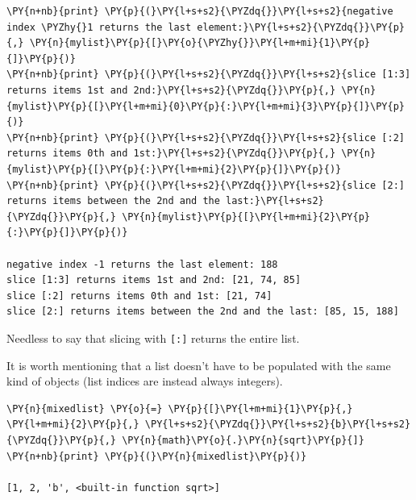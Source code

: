 \begin{codebox}[breakable, size=fbox, boxrule=1pt, pad at break*=1mm, colback=cellbackground, colframe=cellborder]
\begin{Verbatim}[commandchars=\\\{\}]
\PY{n+nb}{print} \PY{p}{(}\PY{l+s+s2}{\PYZdq{}}\PY{l+s+s2}{negative index \PYZhy{}1 returns the last element:}\PY{l+s+s2}{\PYZdq{}}\PY{p}{,} \PY{n}{mylist}\PY{p}{[}\PY{o}{\PYZhy{}}\PY{l+m+mi}{1}\PY{p}{]}\PY{p}{)}
\PY{n+nb}{print} \PY{p}{(}\PY{l+s+s2}{\PYZdq{}}\PY{l+s+s2}{slice [1:3] returns items 1st and 2nd:}\PY{l+s+s2}{\PYZdq{}}\PY{p}{,} \PY{n}{mylist}\PY{p}{[}\PY{l+m+mi}{0}\PY{p}{:}\PY{l+m+mi}{3}\PY{p}{]}\PY{p}{)}
\PY{n+nb}{print} \PY{p}{(}\PY{l+s+s2}{\PYZdq{}}\PY{l+s+s2}{slice [:2] returns items 0th and 1st:}\PY{l+s+s2}{\PYZdq{}}\PY{p}{,} \PY{n}{mylist}\PY{p}{[}\PY{p}{:}\PY{l+m+mi}{2}\PY{p}{]}\PY{p}{)}
\PY{n+nb}{print} \PY{p}{(}\PY{l+s+s2}{\PYZdq{}}\PY{l+s+s2}{slice [2:] returns items between the 2nd and the last:}\PY{l+s+s2}{\PYZdq{}}\PY{p}{,} \PY{n}{mylist}\PY{p}{[}\PY{l+m+mi}{2}\PY{p}{:}\PY{p}{]}\PY{p}{)}

negative index -1 returns the last element: 188
slice [1:3] returns items 1st and 2nd: [21, 74, 85]
slice [:2] returns items 0th and 1st: [21, 74]
slice [2:] returns items between the 2nd and the last: [85, 15, 188]
\end{Verbatim}
\end{codebox}
\noindent
Needless to say that slicing with \texttt{[:]} returns the entire list.

It is worth mentioning that a list doesn't have to be populated
with the same kind of objects (list indices are instead always
integers).

\begin{codebox}[breakable, size=fbox, boxrule=1pt, pad at break*=1mm, colback=cellbackground, colframe=cellborder]
\begin{Verbatim}[commandchars=\\\{\}]
\PY{n}{mixedlist} \PY{o}{=} \PY{p}{[}\PY{l+m+mi}{1}\PY{p}{,} \PY{l+m+mi}{2}\PY{p}{,} \PY{l+s+s2}{\PYZdq{}}\PY{l+s+s2}{b}\PY{l+s+s2}{\PYZdq{}}\PY{p}{,} \PY{n}{math}\PY{o}{.}\PY{n}{sqrt}\PY{p}{]}
\PY{n+nb}{print} \PY{p}{(}\PY{n}{mixedlist}\PY{p}{)}

[1, 2, 'b', <built-in function sqrt>]
\end{Verbatim}
\end{codebox}

